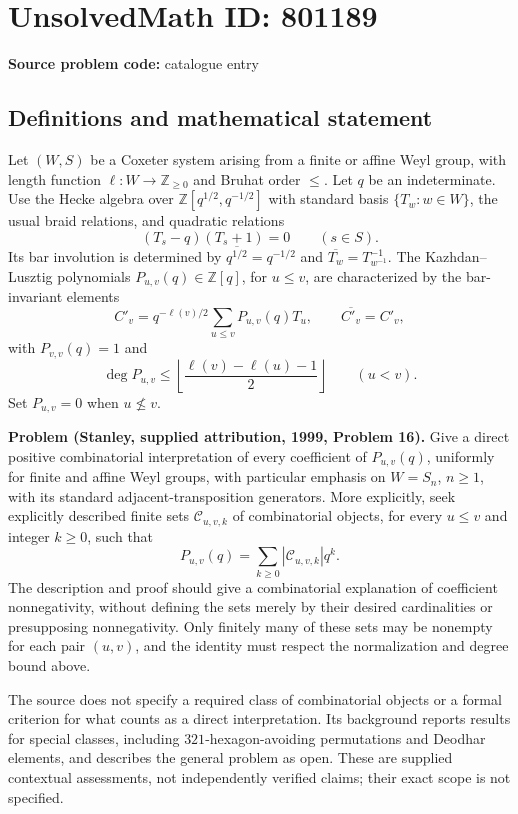 \documentclass[11pt]{article}
\newcommand{\Z}{\mathbb{Z}}
\begin{document}
\section*{UnsolvedMath ID: 801189}
\textbf{Source problem code:} catalogue entry
\subsection{Definitions and mathematical statement}
Let \((W,S)\) be a Coxeter system arising from a finite or affine Weyl group, with length function \(\ell:W\to\Z_{\geq 0}\) and Bruhat order \(\leq\). Let \(q\) be an indeterminate. Use the Hecke algebra over \(\Z[q^{1/2},q^{-1/2}]\) with standard basis \(\{T_w:w\in W\}\), the usual braid relations, and quadratic relations
\[
(T_s-q)(T_s+1)=0\qquad(s\in S).
\]
Its bar involution is determined by \(\overline{q^{1/2}}=q^{-1/2}\) and \(\overline{T_w}=T_{w^{-1}}^{-1}\). The Kazhdan--Lusztig polynomials \(P_{u,v}(q)\in\Z[q]\), for \(u\leq v\), are characterized by the bar-invariant elements
\[
C'_v=q^{-\ell(v)/2}\sum_{u\leq v}P_{u,v}(q)T_u,
\qquad \overline{C'_v}=C'_v,
\]
with \(P_{v,v}(q)=1\) and
\[
\deg P_{u,v}\leq\left\lfloor\frac{\ell(v)-\ell(u)-1}{2}\right\rfloor
\qquad(u<v).
\]
Set \(P_{u,v}=0\) when \(u\not\leq v\).

\textbf{Problem (Stanley, supplied attribution, 1999, Problem 16).} Give a direct positive combinatorial interpretation of every coefficient of \(P_{u,v}(q)\), uniformly for finite and affine Weyl groups, with particular emphasis on \(W=S_n\), \(n\geq1\), with its standard adjacent-transposition generators. More explicitly, seek explicitly described finite sets \(\mathcal{C}_{u,v,k}\) of combinatorial objects, for every \(u\leq v\) and integer \(k\geq0\), such that
\[
P_{u,v}(q)=\sum_{k\geq0}|\mathcal{C}_{u,v,k}|q^k.
\]
The description and proof should give a combinatorial explanation of coefficient nonnegativity, without defining the sets merely by their desired cardinalities or presupposing nonnegativity. Only finitely many of these sets may be nonempty for each pair \((u,v)\), and the identity must respect the normalization and degree bound above.

The source does not specify a required class of combinatorial objects or a formal criterion for what counts as a direct interpretation. Its background reports results for special classes, including \(321\)-hexagon-avoiding permutations and Deodhar elements, and describes the general problem as open. These are supplied contextual assessments, not independently verified claims; their exact scope is not specified.
\end{document}

